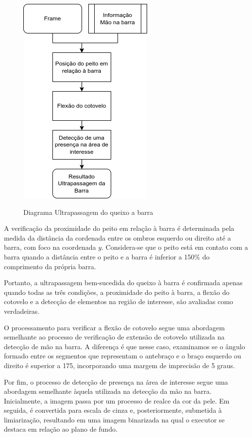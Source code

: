 \begin{figure}[H]
	\centering
    \caption{Diagrama Ultrapassagem do queixo a barra }
	\includegraphics[scale=0.75]{figuras/diagrama/ultrapassagem_barra.png}
	\label{dia:ultrapassagem}
\end{figure}


A verificação da proximidade do peito em relação à barra é determinada pela medida da distância da cordenada entre os ombros esquerdo ou direito até a barra, com foco na coordenada $y$. Considera-se que o peito está em contato com a barra quando a distância entre o peito e a barra é inferior a 150\% do comprimento da própria barra.


Portanto, a ultrapassagem bem-sucedida do queixo à barra é confirmada apenas quando todas as três condições, a proximidade do peito à barra, a flexão do cotovelo e a detecção de elementos na região de interesse, são avaliadas como verdadeiras.

O processamento para verificar a flexão de cotovelo segue uma abordagem semelhante ao processo de verificação de extensão de cotovelo utilizada na detecção de mão na barra. A diferença é que nesse caso, examinamos se o ângulo formado entre os segmentos que representam o antebraço e o braço esquerdo ou direito é superior a 175, incorporando uma margem de imprecisão de 5 graus.

Por fim, o processo de detecção de presença na área de interesse segue uma abordagem semelhante àquela utilizada na detecção da mão na barra. Inicialmente, a imagem passa por um processo de realce da cor da pele. Em seguida, é convertida para escala de cinza e, posteriormente, submetida à limiarização, resultando em uma imagem binarizada na qual o executor se destaca em relação ao plano de fundo.

